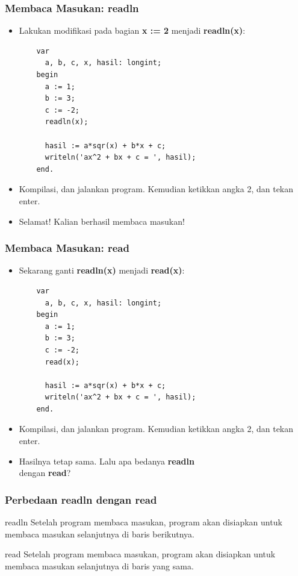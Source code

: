 \begin{frame}[fragile]
\frametitle{Membaca Masukan: readln}
\begin{itemize}
  \item Lakukan modifikasi pada bagian \textbf{x := 2} menjadi \textbf{readln(x)}:
  \begin{lstlisting}
    var
      a, b, c, x, hasil: longint;
    begin
      a := 1;
      b := 3;
      c := -2;
      readln(x);

      hasil := a*sqr(x) + b*x + c;
      writeln('ax^2 + bx + c = ', hasil);
    end.
  \end{lstlisting}
  \item Kompilasi, dan jalankan program. Kemudian ketikkan angka 2, dan tekan enter.
  \item Selamat! Kalian berhasil membaca masukan!
\end{itemize}
\end{frame}

\begin{frame}[fragile]
\frametitle{Membaca Masukan: read}
\begin{itemize}
  \item Sekarang ganti \textbf{readln(x)} menjadi \textbf{read(x)}:
  \begin{lstlisting}
    var
      a, b, c, x, hasil: longint;
    begin
      a := 1;
      b := 3;
      c := -2;
      read(x);

      hasil := a*sqr(x) + b*x + c;
      writeln('ax^2 + bx + c = ', hasil);
    end.
  \end{lstlisting}
  \item Kompilasi, dan jalankan program. Kemudian ketikkan angka 2, dan tekan enter.
  \item Hasilnya tetap sama. Lalu apa bedanya \textbf{readln} \\ dengan \textbf{read}?
\end{itemize}
\end{frame}

\begin{frame}[fragile]
\frametitle{Perbedaan readln dengan read}
\begin{block}{readln}
  Setelah program membaca masukan, program akan disiapkan untuk membaca masukan selanjutnya di \alert{baris berikutnya}.
\end{block}
\begin{block}{read}
  Setelah program membaca masukan, program akan disiapkan untuk membaca masukan selanjutnya di \alert{baris yang sama}.
\end{block}
\end{frame}

